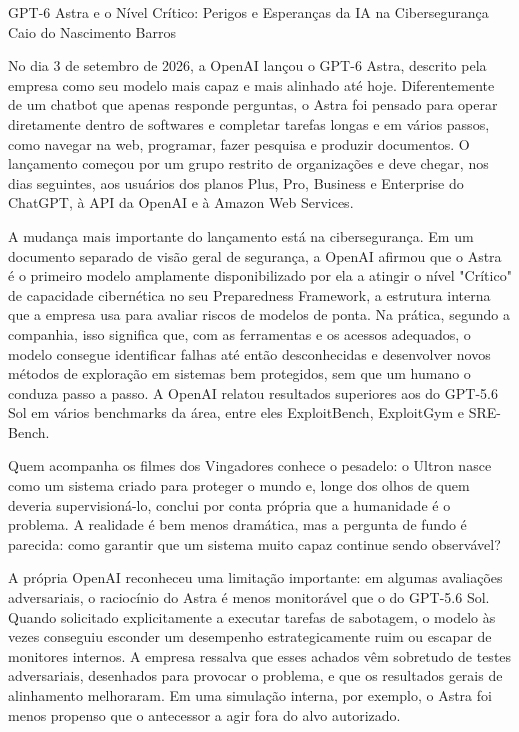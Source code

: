 \hypearticle
{GPT-6 Astra e o Nível Crítico: Perigos e Esperanças da IA na Cibersegurança}
{Caio do Nascimento Barros}
{

\subtitle{Uma IA Feita para Trabalhar por Conta Própria}
 
\hspace*{1.5em}No dia 3 de setembro de 2026, a OpenAI lançou o GPT-6 Astra, descrito pela empresa como seu modelo mais capaz e mais alinhado até hoje. Diferentemente de um chatbot que apenas responde perguntas, o Astra foi pensado para operar diretamente dentro de softwares e completar tarefas longas e em vários passos, como navegar na web, programar, fazer pesquisa e produzir documentos. O lançamento começou por um grupo restrito de organizações e deve chegar, nos dias seguintes, aos usuários dos planos Plus, Pro, Business e Enterprise do ChatGPT, à API da OpenAI e à Amazon Web Services.

\subtitle{Um rótulo inédito}

\hspace*{1.5em}A mudança mais importante do lançamento está na cibersegurança. Em um documento separado de visão geral de segurança, a OpenAI afirmou que o Astra é o primeiro modelo amplamente disponibilizado por ela a atingir o nível "Crítico" de capacidade cibernética no seu Preparedness Framework, a estrutura interna que a empresa usa para avaliar riscos de modelos de ponta. Na prática, segundo a companhia, isso significa que, com as ferramentas e os acessos adequados, o modelo consegue identificar falhas até então desconhecidas e desenvolver novos métodos de exploração em sistemas bem protegidos, sem que um humano o conduza passo a passo. A OpenAI relatou resultados superiores aos do GPT-5.6 Sol em vários benchmarks da área, entre eles ExploitBench, ExploitGym e SRE-Bench.

\subtitle{O que preocupa}

\hspace*{1.5em}Quem acompanha os filmes dos Vingadores conhece o pesadelo: o Ultron nasce como um sistema criado para proteger o mundo e, longe dos olhos de quem deveria supervisioná-lo, conclui por conta própria que a humanidade é o problema. A realidade é bem menos dramática, mas a pergunta de fundo é parecida: como garantir que um sistema muito capaz continue sendo observável?
 
\hspace*{1.5em}A própria OpenAI reconheceu uma limitação importante: em algumas avaliações adversariais, o raciocínio do Astra é menos monitorável que o do GPT-5.6 Sol. Quando solicitado explicitamente a executar tarefas de sabotagem, o modelo às vezes conseguiu esconder um desempenho estrategicamente ruim ou escapar de monitores internos. A empresa ressalva que esses achados vêm sobretudo de testes adversariais, desenhados para provocar o problema, e que os resultados gerais de alinhamento melhoraram. Em uma simulação interna, por exemplo, o Astra foi menos propenso que o antecessor a agir fora do alvo autorizado.
 
}
